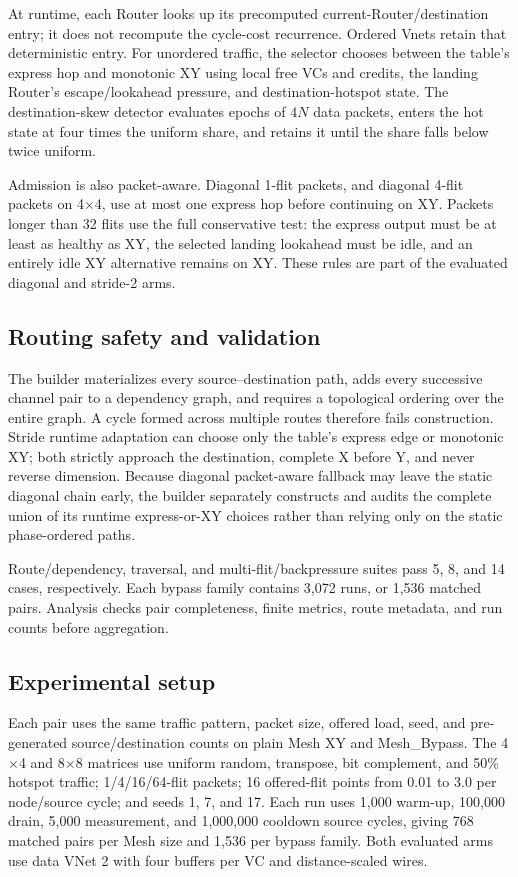 \documentclass[10pt]{article}
\begin{document}
At runtime, each Router looks up its precomputed current-Router/destination
entry; it does not recompute the cycle-cost recurrence.  Ordered Vnets retain
that deterministic entry.  For unordered traffic, the selector chooses between
the table's express hop and monotonic XY using local free VCs and credits, the
landing Router's escape/lookahead pressure, and destination-hotspot state.  The
destination-skew detector evaluates epochs of $4N$ data packets, enters the hot
state at four times the uniform share, and retains it until the share falls
below twice uniform.

Admission is also packet-aware.  Diagonal 1-flit packets, and diagonal 4-flit
packets on 4$\times$4, use at most one express hop before continuing on XY.
Packets longer than 32 flits use the full conservative test: the express output
must be at least as healthy as XY, the selected landing lookahead must be idle,
and an entirely idle XY alternative remains on XY.  These rules are part of
the evaluated diagonal and stride-2 arms.

\subsection{Routing safety and validation}

The builder materializes every source--destination path, adds every successive
channel pair to a dependency graph, and requires a topological ordering over
the entire graph.  A cycle formed across multiple routes therefore fails
construction.  Stride runtime adaptation can choose only the table's express
edge or monotonic XY; both strictly approach the destination, complete X before
Y, and never reverse dimension.  Because diagonal packet-aware fallback may
leave the static diagonal chain early, the builder separately constructs and
audits the complete union of its runtime express-or-XY choices rather than
relying only on the static phase-ordered paths.

Route/dependency, traversal, and multi-flit/backpressure suites pass 5, 8, and
14 cases, respectively.  Each bypass family contains 3,072 runs, or 1,536
matched pairs.  Analysis checks pair completeness, finite metrics, route
metadata, and run counts before aggregation.

\subsection{Experimental setup}

Each pair uses the same traffic pattern, packet size, offered load, seed, and
pre-generated source/destination counts on plain Mesh XY and Mesh\_Bypass.  The
4$\times$4 and 8$\times$8 matrices use uniform random, transpose, bit
complement, and 50\% hotspot traffic; 1/4/16/64-flit packets; 16 offered-flit
points from 0.01 to 3.0 per node/source cycle; and seeds 1, 7, and 17.  Each run
uses 1,000 warm-up, 100,000 drain, 5,000 measurement, and 1,000,000 cooldown
source cycles, giving 768 matched pairs per Mesh size and 1,536 per bypass
family.  Both evaluated arms use data VNet 2 with four buffers per VC and
distance-scaled wires.
\end{document}
